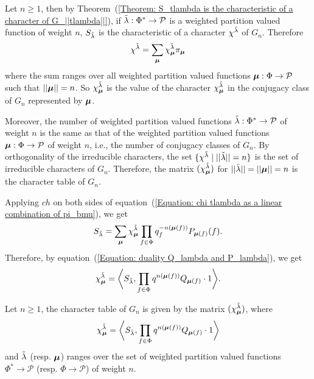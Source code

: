 Let $n\geq1$, then by Theorem~(\ref{Theorem: S_tlambda is the characteristic of a character of G_||tlambda||}), if $\Tilde{\lambda}:\Phi^*\rightarrow \mathcal{P}$ is a weighted partition valued function of weight $n$, $S_{\Tilde{\lambda}}$ is the characteristic of a character $\chi^{\Tilde{\lambda}}$ of $G_n$. Therefore
\begin{equation}\label{Equation: chi tlambda as a linear combination of pi_bmu}
    \chi^{\Tilde{\lambda}}=\sum_{\boldsymbol{\mu}}\chi_{\boldsymbol{\mu}}^{\Tilde{\lambda}}\pi_{\boldsymbol{\mu}}
\end{equation}
where the sum ranges over all weighted partition valued functions $\boldsymbol{\mu}:\Phi\rightarrow\mathcal{P}$ such that $||\boldsymbol{\mu}||=n$. So $\chi_{\boldsymbol{\mu}}^{\Tilde{\lambda}}$ is the value of the character $\chi_{\boldsymbol{\mu}}^{\Tilde{\lambda}}$ in the conjugacy class of $G_n$ represented by $\boldsymbol{\mu}$. \par
 Moreover, the number of weighted partition valued functions $\Tilde{\lambda}:\Phi^*\rightarrow\mathcal{P}$ of weight $n$ is the same as that of the weighted partition valued functions $\boldsymbol{\mu}:\Phi\rightarrow\mathcal{P}$ of weight $n$, i.e., the number of conjugacy classes of $G_n$. By orthogonality of the irreducible characters, the set $\{\chi^{\Tilde{\lambda}}\;|\;||\Tilde{\lambda}||=n\}$ is the set of irreducible characters of $G_n$. Therefore, the matrix $(\chi_{\boldsymbol{\mu}}^{\Tilde{\lambda}})$ for $||\Tilde{\lambda}||=||\boldsymbol{\mu}||=n$ is the character table of $G_n$.\par
 Applying $ch$ on both sides of equation~(\ref{Equation: chi tlambda as a linear combination of pi_bmu}), we get
 \begin{equation}
     S_{\Tilde{\lambda}}= \sum_{\boldsymbol{\mu}}\chi_{\boldsymbol{\mu}}^{\Tilde{\lambda}}\prod_{f\in\Phi}q_f^{-n(\boldsymbol{\mu}(f))}P_{\boldsymbol{\mu}(f)}(f).
 \end{equation}
 Therefore, by equation~(\ref{Equation: duality Q_lambda and P_lambda}), we get
 \begin{equation}
     \chi_{\boldsymbol{\mu}}^{\Tilde{\lambda}}=\biggl< S_{\Tilde{\lambda}},\prod_{f\in\Phi}q^{n(\boldsymbol{\mu}(f))}Q_{\boldsymbol{\mu}(f)}\cdot1\biggr>.
 \end{equation}
 \begin{dang}
     \begin{theorem}\cite{jing2024characters}\label{Theorem: character table for GLn(Fq)}
         Let $n\geq1$, the character table of $G_n$ is given by the matrix $(\chi_{\boldsymbol{\mu}}^{\Tilde{\lambda}})$, where
         \begin{equation}\label{Equation: character table for GLn(Fq)}
              \chi_{\boldsymbol{\mu}}^{\Tilde{\lambda}}=\biggl< S_{\Tilde{\lambda}},\prod_{f\in\Phi}q^{n(\boldsymbol{\mu}(f))}Q_{\boldsymbol{\mu}(f)}\cdot1\biggr>
         \end{equation}
         and $\Tilde{\lambda}$ (resp. $\boldsymbol{\mu}$) ranges over the set of weighted partition valued functions $\Phi^*\rightarrow\mathcal{P}$ (resp. $\Phi\rightarrow\mathcal{P}$) of weight $n$.
     \end{theorem}
 \end{dang}
